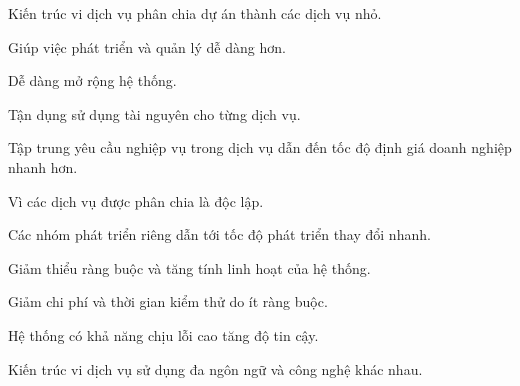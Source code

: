 





Kiến trúc vi dịch vụ phân chia dự án thành các dịch vụ nhỏ.

Giúp việc phát triển và quản lý dễ dàng hơn.

Dễ dàng mở rộng hệ thống.

Tận dụng sử dụng tài nguyên cho từng dịch vụ.

Tập trung yêu cầu nghiệp vụ trong dịch vụ dẫn đến tốc độ định giá doanh nghiệp nhanh hơn.

Vì các dịch vụ được phân chia là độc lập.



Các nhóm phát triển riêng dẫn tới tốc độ phát triển thay đổi nhanh.

Giảm thiểu ràng buộc và tăng tính linh hoạt của hệ thống.

Giảm chi phí và thời gian kiểm thử do ít ràng buộc.

Hệ thống có khả năng chịu lỗi cao tăng độ tin cậy.

Kiến trúc vi dịch vụ sử dụng đa ngôn ngữ và công nghệ khác nhau.

